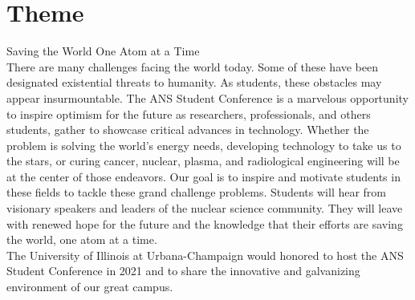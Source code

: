 \section{Theme}

\Huge{Saving the World One Atom at a Time}\\

There are many challenges facing the world today. Some of these have been designated existential threats to humanity. As students, these obstacles may appear insurmountable. The ANS Student Conference is a marvelous opportunity to inspire optimism for the future as researchers, professionals, and others students, gather to showcase critical advances in technology. Whether the problem is solving the world's energy needs, developing technology to take us to the stars, or curing cancer, nuclear, plasma, and radiological engineering will be at the center of those endeavors. Our goal is to inspire and motivate students in these fields to tackle these grand challenge problems. Students will hear from visionary speakers and leaders of the nuclear science community. They will leave with renewed hope for the future and the knowledge that their efforts are saving the world, one atom at a time.\\
The University of Illinois at Urbana-Champaign would honored to host the ANS Student Conference in 2021 and to share the innovative and galvanizing environment of our great campus. 